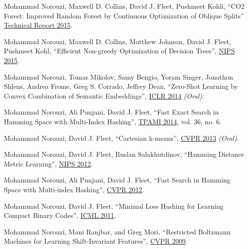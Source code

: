 \documentclass[10pt,letterpaper]{article}
\renewenvironment{itemize}{
  \begin{list}{}{
    \setlength{\leftmargin}{1.5em}
  }
}{
  \end{list}
}
\begin{document}
\begin{itemize}
\item
Mohammad Norouzi, Maxwell D. Collins, David J. Fleet, Pushmeet Kohli,
``CO2 Forest: Improved Random Forest by Continuous Optimization of Oblique Splits''
\href{https://arxiv.org/pdf/1506.06155}%
{Technical Report 2015}.

\item
Mohammad Norouzi, Maxwell D. Collins, Matthew Johnson, David J. Fleet, Pushmeet Kohl,
``Efficient Non-greedy Optimization of Decision Trees'',
\href{http://arxiv.org/pdf/1511.04056}{NIPS 2015}.

\item
Mohammad Norouzi, Tomas Mikolov, Samy Bengio, Yoram Singer, Jonathon Shlens, Andrea Frome, Greg S. Corrado, Jeffrey Dean,
``Zero-Shot Learning by Convex Combination of Semantic Embeddings'',
\href{http://arxiv.org/pdf/1312.5650}{ICLR 2014} {\em (Oral)}.

\item
Mohammad Norouzi, Ali Punjani, David J. Fleet, ``Fast Exact Search in Hamming Space with Multi-Index Hashing'',
\href{https://arxiv.org/pdf/1307.2982}%
{TPAMI 2014}, vol. 36, no. 6.

\item
  Mohammad Norouzi, David J. Fleet, ``Cartesian k-means'',
\href{https://norouzi.github.io/research/papers/ckmeans.pdf}{CVPR 2013} {\em (Oral)}.


\item
  Mohammad Norouzi, David J. Fleet, Ruslan Salakhutdinov,
  ``Hamming Distance Metric Learning'',
  \href{https://norouzi.github.io/research/papers/hdml.pdf}{NIPS 2012}.

\item
  Mohammad Norouzi, Ali Punjani, David J. Fleet,
  ``Fast Search in Hamming Space with Multi-index Hashing'',
  \href{https://norouzi.github.io/research/papers/multi_index_hashing.pdf}{CVPR 2012}.

\item 
  Mohammad Norouzi, David J. Fleet, ``Minimal Loss Hashing for Learning Compact Binary Codes'',
  \href{https://norouzi.github.io/research/papers/min_loss_hash.pdf}{ICML 2011}.

\item 
  Mohammad Norouzi, Mani Ranjbar, and Greg Mori, ``Restricted Boltzmann Machines for Learning Shift-Invariant Features'',
  \href{https://norouzi.github.io/research/papers/conv_rbm.pdf}{CVPR 2009}.
\end{itemize}
\end{document}
